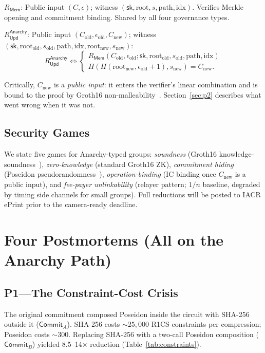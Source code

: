 \documentclass[journal]{IEEEtran}
\newcommand{\Commit}{\mathsf{Commit}}
\newcommand{\Rmem}{R_{\mathsf{Mem}}}
\newcommand{\Rupd}{R_{\mathsf{Upd}}^{\mathsf{Anarchy}}}
\newcommand{\sk}{\mathsf{sk}}
\newcommand{\IC}{\mathsf{IC}}
\begin{document}
$\Rmem$: Public input $(C, \epsilon)$; witness $(\sk, \text{root}, s, \text{path}, \text{idx})$. Verifies Merkle opening and commitment binding. Shared by all four governance types.

$\Rupd$: Public input $(C_\text{old}, \epsilon_\text{old}, C_\text{new})$; witness $(\sk, \text{root}_\text{old}, s_\text{old}, \text{path}, \text{idx}, \text{root}_\text{new}, s_\text{new})$:
\begin{equation}
\Rupd \iff
\begin{cases}
\Rmem(C_\text{old}, \epsilon_\text{old}; \sk, \text{root}_\text{old}, s_\text{old}, \text{path}, \text{idx})\\
H(H(\text{root}_\text{new}, \epsilon_\text{old}+1), s_\text{new}) = C_\text{new}.
\end{cases}
\end{equation}

Critically, $C_\text{new}$ is a \emph{public input}: it enters the verifier's \IC{} linear combination and is bound to the proof by Groth16 non-malleability~\cite{groth2016,lipmaa2019}. Section~\ref{sec:p2} describes what went wrong when it was not.

\subsection{Security Games}

We state five games for Anarchy-typed groups: \emph{soundness} (Groth16 knowledge-soundness~\cite{groth2016}), \emph{zero-knowledge} (standard Groth16 ZK), \emph{commitment hiding} (Poseidon pseudorandomness~\cite{grassi2021poseidon}), \emph{operation-binding} (IC binding once $C_\text{new}$ is a public input), and \emph{fee-payer unlinkability} (relayer pattern; $1/n$ baseline, degraded by timing side channels for small groups). Full reductions will be posted to IACR ePrint prior to the camera-ready deadline.

\section{Four Postmortems (All on the Anarchy Path)}

\subsection{P1---The Constraint-Cost Crisis}

The original commitment composed Poseidon inside the circuit with SHA-256 outside it ($\Commit_A$). SHA-256 costs ${\sim}25{,}000$ R1CS constraints per compression; Poseidon costs ${\sim}300$. Replacing SHA-256 with a two-call Poseidon composition ($\Commit_B$) yielded 8.5--14$\times$ reduction (Table~\ref{tab:constraints}).
\end{document}
